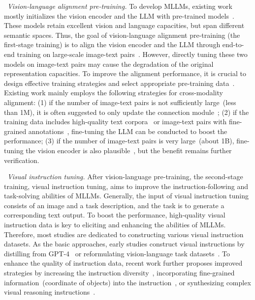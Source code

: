 {\textbullet~\emph{Vision-language alignment pre-training.}
 {To develop MLLMs, existing work mostly initializes the vision encoder and the LLM with pre-trained models~\cite{Alayrac-nips-2022-flamingo, Liu-arxiv-2023-Visual, Zhu-arxiv-2023-MiniGPT-4}. These models retain excellent vision and language capacities, but span different semantic spaces. Thus, the goal of vision-language alignment pre-training (\ie the first-stage training) is to align the vision encoder and the LLM through end-to-end training on large-scale image-text pairs~\cite{Schuhmann-nips-2022-laion5b, Changpinyo-cvpr-2023-conceptual}. However, directly tuning these two models on image-text pairs may cause the degradation of the original representation capacities. %
 To improve the alignment performance, it is crucial to design effective training strategies and select appropriate pre-training data~\cite{Ye-arxiv-2023-mplug, Bai-arxiv-2023-qwen}.  
% 
Existing work mainly employs the following strategies for cross-modality alignment: (1) if the number of image-text pairs is not sufficiently large~(\eg less than 1M), it is often suggested to only update the connection module~\cite{Liu-arxiv-2023-improved}; (2) if the training data includes high-quality text corpora~\cite{Zhang-arxiv-2023-internlm} or image-text pairs with fine-grained annotations~\cite{Chen-arxiv-2023-shikra},  fine-tuning the LLM can be conducted to boost the performance;  (3) if the number of image-text pairs is very large~(\eg about 1B), fine-tuning the vision encoder is also plausible~\cite{Ye-arxiv-2023-mplug,Bai-arxiv-2023-qwen}, but the benefit remains further verification.} 

\textbullet~\emph{Visual instruction tuning.}  %
{After vision-language pre-training, the second-stage training, \ie visual instruction tuning, aims to improve the instruction-following and task-solving abilities of MLLMs. Generally, the input of visual instruction tuning consists of an image and a task description, and the task is to generate a corresponding text output. 
To boost the performance, high-quality visual instruction data is key to eliciting and enhancing the abilities of MLLMs. 
Therefore, most studies are dedicated to constructing various visual instruction datasets. As the basic approaches, early studies construct visual instructions by distilling from GPT-4~\cite{Liu-arxiv-2023-Visual} or reformulating vision-language task datasets~\cite{Dai-2023-arxiv-InstructBLIP}. To enhance the quality of instruction data, recent work further proposes improved strategies by increasing the instruction diversity~\cite{liu-arxiv-2023-aligning}, incorporating fine-grained information~(\eg coordinate of objects) into the instruction~\cite{Chen-arxiv-2023-shikra}, or synthesizing complex visual reasoning instructions~\cite{Du-arxiv-2023-What}.  
}

}
